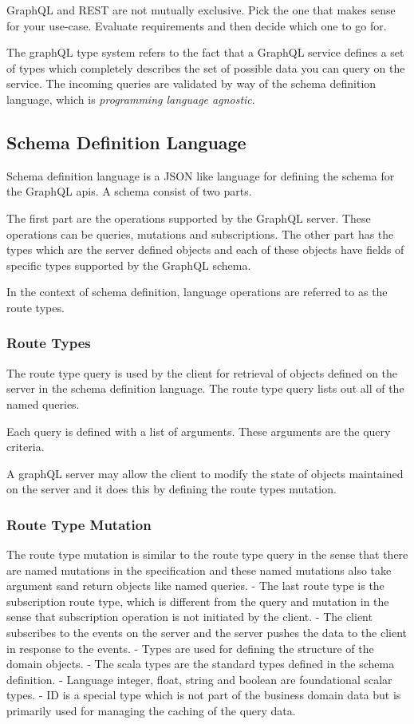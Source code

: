 \documentclass[a4paper, 11pt]{book}
\begin{document}
    GraphQL and REST are not mutually exclusive.
    Pick the one that makes sense for your use-case.
    Evaluate requirements and then decide which one to go for.

    The graphQL type system refers to the fact that a GraphQL service defines a set of types which completely describes the set of possible data you can query on the service.
    The incoming queries are validated by way of the schema definition language, which is \textit{programming language agnostic}.

    \subsection{Schema Definition Language}
    Schema definition language is a JSON like language for defining the schema for the GraphQL apis.
    A schema consist of two parts.

    The first part are the operations supported by the GraphQL server.
    These operations can be queries, mutations and subscriptions.
    The other part has the types which are the server defined objects and each of these objects have fields of specific types supported by the GraphQL schema.

    In the context of schema definition, language operations are referred to as the route types.

    \subsubsection{Route Types}
    The route type query is used by the client for retrieval of objects defined on the server in the schema definition language.
    The route type query lists out all of the named queries.

    Each query is defined with a list of arguments.
    These arguments are the query criteria.

    A graphQL server may allow the client to modify the state of objects maintained on the server and it does this by defining the route types mutation.

    \subsubsection{Route Type Mutation}
    The route type mutation is similar to the route type query in the sense that there are named mutations in the specification and these named mutations also take argument sand return objects like named queries.
    - The last route type is the subscription route type, which is different from the query and mutation in the sense that subscription operation is not initiated by the client.
    - The client subscribes to the events on the server and the server pushes the data to the client in response to the events.
    - Types are used for defining the structure of the domain objects.
    - The scala types are the standard types defined in the schema definition.
    - Language integer, float, string and boolean are foundational scalar types.
    - ID is a special type which is not part of the business domain data but is primarily used for managing the caching of the query data.
\end{document}
